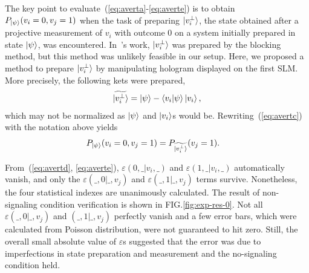 \documentclass[pra,aps,notitlepage,superscriptaddress,showpacs,showkeys]{revtex4-1}
\theoremstyle{definition}
\theoremstyle{remark}
\begin{document}
 The key point to evaluate~(\ref{eq:averta}-\ref{eq:averte}) is to obtain $P_{\ket{\psi}} (v_i = 0, v_j = 1)$ when the task of preparing $\ket{v_i^\perp}$, the state obtained after a projective measurement of $v_i$ with outcome 0 on a system initially prepared in state $\ket{\psi}$, was encountered. In~\cite{yxiao17s}'s work, $\ket{v_i^\perp}$ was prepared by the blocking method, but this method was unlikely feasible in our setup.
 Here, we proposed a method to prepare $\ket{v_i^\perp}$ by manipulating hologram displayed on the first SLM. More precisely, the following kets were prepared,
    \begin{align}
        \widetilde{\ket{v_i^\perp}} = \ket{\psi} - \braket{v_i|\psi}\ket{v_i},
    \end{align}
 which may not be normalized as $\ket{\psi}$ and $\ket{v_i}$s would be. Rewriting~(\ref{eq:avertc}) with the notation above yields
    \begin{align}
        P_{\ket{\psi}} (v_i = 0, v_j = 1) &= P_{\widetilde{\ket{v_i^\perp}}} (v_j = 1).
    \end{align}


 From~(\ref{eq:avertd}, \ref{eq:averte}), $\varepsilon(0, \_|v_i, \_)$ and $\varepsilon(1, \_|v_i, \_)$ automatically vanish, and only the $\varepsilon(\_, 0|\_, v_j)$ and $\varepsilon(\_, 1|\_, v_j)$ terms survive. Nonetheless, the four statistical indexes are unanimously calculated.
 The result of non-signaling condition verification is shown in FIG.\ref{fig:exp-res-0}. Not all $\varepsilon(\_, 0|\_, v_j)$ and $(\_, 1|\_, v_j)$ perfectly vanish and a few error bars, which were calculated from Poisson distribution, were not guaranteed to hit zero.
 Still, the overall small absolute value of $\varepsilon$s suggested that the error was due to imperfections in state preparation and measurement and the no-signaling condition held.
\end{document}
